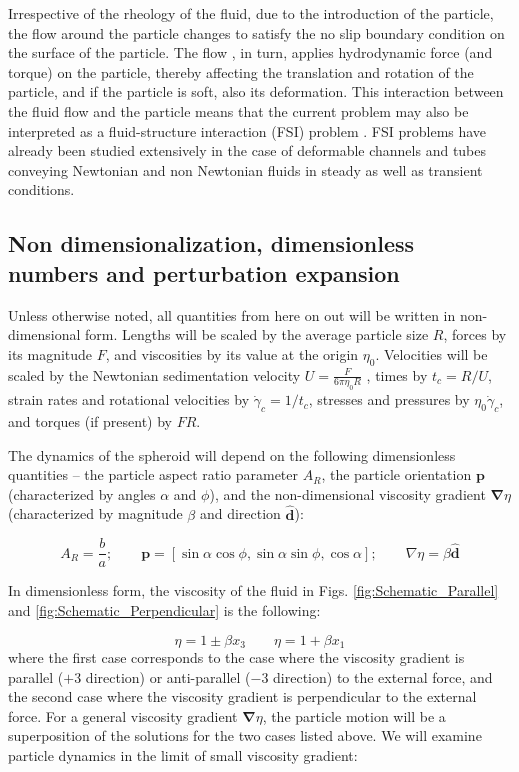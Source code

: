 \documentclass{jfm}
\begin{document}
 Irrespective of the rheology of the fluid, due to the introduction of the particle, the flow around the particle changes to satisfy the no slip boundary condition on the surface of the particle. The flow , in turn, applies hydrodynamic force (and torque) on the particle, thereby affecting the translation and rotation of the particle, and if the particle is soft, also its deformation. This interaction between the fluid flow and the particle means that the current problem may also be interpreted as a fluid-structure interaction (FSI) problem . FSI problems have already been studied extensively in the case of deformable channels \citep{ADC18,VAN22}and tubes \citep{AC18b,AC19a,AC20} conveying Newtonian and non Newtonian fluids in steady as well as transient conditions.

\subsection{Non dimensionalization, dimensionless numbers and perturbation expansion}
 Unless otherwise noted, all quantities from here on out will be written in non-dimensional form.  Lengths will be scaled by the average particle size $R$, forces by its magnitude $F$, and viscosities by its value at the origin $\eta_0$.  Velocities will be scaled by the Newtonian sedimentation velocity $U =\frac{F}{6\pi \eta_0 R}$ , times by $t_c=R/U$, strain rates and rotational velocities by $\dot{\gamma}_c =1/t_c$, stresses and pressures by $\eta_0\dot{\gamma}_c$, and torques (if present) by $FR$.

The dynamics of the spheroid will depend on the following dimensionless quantities – the particle aspect ratio parameter $A_R$, the particle orientation $\boldsymbol{p}$ (characterized by angles $\alpha$ and $\phi$), and the non-dimensional viscosity gradient $\boldsymbol{\nabla} \eta$ (characterized by magnitude $\beta$ and direction $\boldsymbol{\hat{d}}$):

\begin{equation}
    A_R = \frac{b}{a}; \qquad \boldsymbol{p} = [\sin\alpha \cos \phi, 
 \sin \alpha \sin \phi, \cos \alpha]; \qquad \nabla \eta = \beta \boldsymbol{\hat{d}}
\end{equation}
 
In dimensionless form, the viscosity of the fluid in Figs. \ref{fig:Schematic_Parallel} and \ref{fig:Schematic_Perpendicular} is the following:

\begin{equation}
    \eta =1\pm \beta x_3 \qquad
    \eta = 1+\beta x_1
\end{equation}
where the first case corresponds to the case where the viscosity gradient is parallel ($+3$ direction) or anti-parallel ($-3$ direction) to the external force, and the second case where the viscosity gradient is perpendicular to the external force.  For a general viscosity gradient $\boldsymbol{\nabla} \eta$, the particle motion will be a superposition of the solutions for the two cases listed above.  We will examine particle dynamics in the limit of small viscosity gradient:
\end{document}
